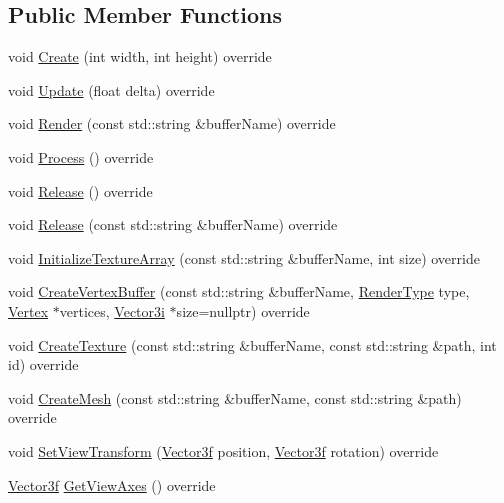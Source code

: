 \subsection*{Public Member Functions}
\begin{DoxyCompactItemize}
\item 
void \mbox{\hyperlink{classse_1_1_direct3_d_af88b0fb33fe5bff1112213e6c8faf466}{Create}} (int width, int height) override
\item 
void \mbox{\hyperlink{classse_1_1_direct3_d_a39934c194406f108a992d82a4d265381}{Update}} (float delta) override
\item 
void \mbox{\hyperlink{classse_1_1_direct3_d_a31e3c97cd8ceeaea58017b66bd60b9d7}{Render}} (const std\+::string \&buffer\+Name) override
\item 
void \mbox{\hyperlink{classse_1_1_direct3_d_aa87e49a2704cc5da20655ce41ae9782b}{Process}} () override
\item 
void \mbox{\hyperlink{classse_1_1_direct3_d_ae2979f16a5c35773cf2c243d8e6f90e4}{Release}} () override
\item 
void \mbox{\hyperlink{classse_1_1_direct3_d_a77f814cda45f2b490e11c522f8e752e3}{Release}} (const std\+::string \&buffer\+Name) override
\item 
void \mbox{\hyperlink{classse_1_1_direct3_d_a7d5db09c1cf0c5c45f61c631b174fcf2}{Initialize\+Texture\+Array}} (const std\+::string \&buffer\+Name, int size) override
\item 
void \mbox{\hyperlink{classse_1_1_direct3_d_a52e0bbf13e8045dab39bb2ef34028a94}{Create\+Vertex\+Buffer}} (const std\+::string \&buffer\+Name, \mbox{\hyperlink{namespacese_a9ed62241331cac830c5c1ba8450afc2b}{Render\+Type}} type, \mbox{\hyperlink{structse_1_1_vertex}{Vertex}} $\ast$vertices, \mbox{\hyperlink{namespacese_ada11715de7cf6e87b5dfb4611fe68d29}{Vector3i}} $\ast$size=nullptr) override
\item 
void \mbox{\hyperlink{classse_1_1_direct3_d_a33c350a77a959847d3571e14feb72c85}{Create\+Texture}} (const std\+::string \&buffer\+Name, const std\+::string \&path, int id) override
\item 
void \mbox{\hyperlink{classse_1_1_direct3_d_aab3d1a8b4ee8812dea07f5ecda5efc42}{Create\+Mesh}} (const std\+::string \&buffer\+Name, const std\+::string \&path) override
\item 
void \mbox{\hyperlink{classse_1_1_direct3_d_a0294b31c151540af98c78d1e33cb369a}{Set\+View\+Transform}} (\mbox{\hyperlink{namespacese_a12e07512d95e2fdebdaf74a5ea2cf5f6}{Vector3f}} position, \mbox{\hyperlink{namespacese_a12e07512d95e2fdebdaf74a5ea2cf5f6}{Vector3f}} rotation) override
\item 
\mbox{\hyperlink{namespacese_a12e07512d95e2fdebdaf74a5ea2cf5f6}{Vector3f}} \mbox{\hyperlink{classse_1_1_direct3_d_a74d6926ba18dac6ce23c7dea433de7bd}{Get\+View\+Axes}} () override
\end{DoxyCompactItemize}


